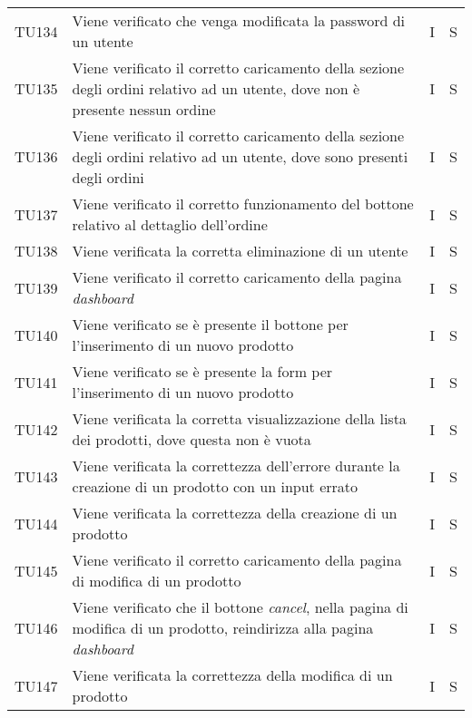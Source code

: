 {\begin{longtable}{C{2cm} C{9.6cm} C{1.5cm} C{1cm}}
TU134 & Viene verificato che venga modificata la password di un utente & I & S\\

TU135 & Viene verificato il corretto caricamento della sezione degli ordini relativo ad un utente, dove non è presente nessun ordine & I & S\\

TU136 & Viene verificato il corretto caricamento della sezione degli ordini relativo ad un utente, dove sono presenti degli ordini & I & S\\

TU137 & Viene verificato il corretto funzionamento del bottone relativo al dettaglio dell'ordine & I & S\\

TU138 & Viene verificata la corretta eliminazione di un utente & I & S\\

TU139 & Viene verificato il corretto caricamento della pagina \textit{dashboard} & I & S\\

TU140 & Viene verificato se è presente il bottone per l'inserimento di un nuovo prodotto & I & S\\

TU141 & Viene verificato se è presente la form per l'inserimento di un nuovo prodotto & I & S\\

TU142 & Viene verificata la corretta visualizzazione della lista dei prodotti, dove questa non è vuota & I & S\\

TU143 & Viene verificata la correttezza dell'errore durante la creazione di un prodotto con un input errato & I & S\\

TU144 & Viene verificata la correttezza della creazione di un prodotto & I & S\\

TU145 & Viene verificato il corretto caricamento della pagina di modifica di un prodotto & I & S\\

TU146 & Viene verificato che il bottone \textit{cancel}, nella pagina di modifica di un prodotto, reindirizza alla pagina \textit{dashboard} & I & S\\

TU147 & Viene verificata la correttezza della modifica di un prodotto & I & S\\


\end{longtable}}
